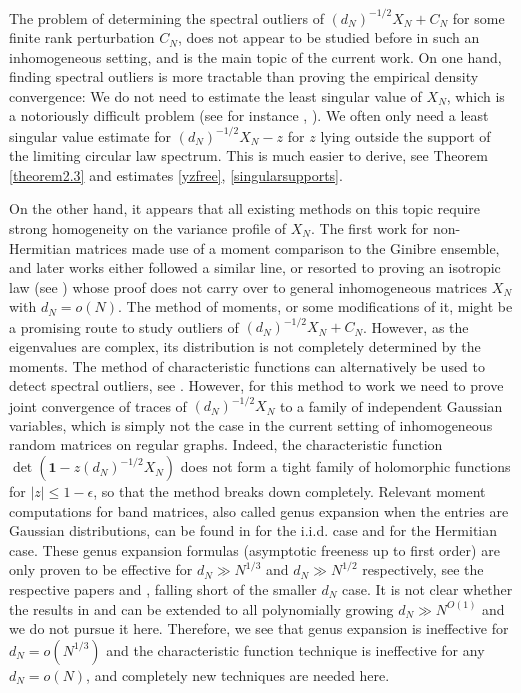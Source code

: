 \documentclass[11pt,reqno]{amsart}
\theoremstyle{plain}
\theoremstyle{remark}
\numberwithin{equation}{section}
\begin{document}
The problem of determining the spectral outliers of $(d_N)^{-1/2}X_N+C_N$ for some finite rank perturbation $C_N$, does not appear to be studied before in such an inhomogeneous setting, and is the main topic of the current work. On one hand, finding spectral outliers is more tractable than proving the empirical density convergence: We do not need to estimate the least singular value of $X_N$, which is a notoriously difficult problem (see for instance \cite{jain2021circular}, \cite{tikhomirov2023pseudospectrum}). We often only need a least singular value estimate for $(d_N)^{-1/2}X_N-z$ for $z$ lying outside the support of the limiting circular law spectrum. This is much easier to derive, see Theorem \ref{theorem2.3} and estimates \eqref{yzfree}, \eqref{singularsupports}.


On the other hand, it appears that all existing methods on this topic require strong homogeneity on the variance profile of $X_N$. The first work for non-Hermitian matrices \cite{tao2013outliers} made use of a moment comparison to the Ginibre ensemble, and later works either followed a similar line, or resorted to proving an isotropic law (see \cite{article1221}) whose proof does not carry over to general inhomogeneous matrices $X_N$ with $d_N=o(N)$. The method of moments, or some modifications of it, might be a promising route to study outliers of $(d_N)^{-1/2}X_N+C_N$. However, as the eigenvalues are complex, its distribution is not completely determined by the moments. The method of characteristic functions can alternatively be used to detect spectral outliers, see \cite{bordenave2021convergence}. However, for this method to work we need to prove joint convergence of traces of $(d_N)^{-1/2}X_N$ to a family of independent Gaussian variables, which is simply not the case in the current setting of inhomogeneous random matrices on regular graphs. Indeed, the characteristic function $\det(\mathbf{1}-z(d_N)^{-1/2}X_N)$ does not form a tight family of holomorphic functions for $|z|\leq 1-\epsilon$, so that the method breaks down completely. Relevant moment computations for band matrices, also called genus expansion when the entries are Gaussian distributions, can be found in \cite{dubach2021words} for the i.i.d. case and \cite{au2021finite} for the Hermitian case. These genus expansion formulas (asymptotic freeness up to first order) are only proven to be effective for $d_N\gg N^{1/3}$ and $d_N\gg N^{1/2}$ respectively, see the respective papers \cite{dubach2021words} and \cite{au2021finite}, falling short of the smaller $d_N$ case. It is not clear whether the results in \cite{dubach2021words} and \cite{au2021finite} can be extended to all polynomially growing $d_N\gg N^{O(1)}$ and we do not pursue it here. Therefore, we see that genus expansion is ineffective for $d_N=o(N^{1/3})$ and the characteristic function technique is ineffective for any $d_N=o(N)$, and completely new techniques are needed here.
\end{document}

